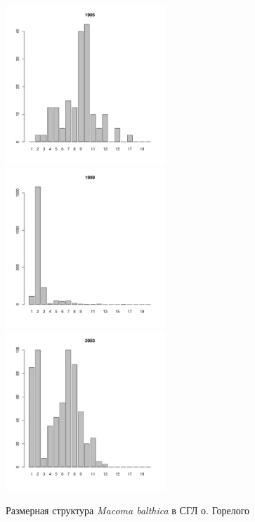 \documentclass[12pt, a4paper]{article}
\begin{document}
\begin{figure}[h]
\begin{multicols}{3}
\hfill
\includegraphics[width=60mm]{../White_Sea/Luvenga_Goreliy/middle_1995_.pdf}
\hfill
\includegraphics[width=60mm]{../White_Sea/Luvenga_Goreliy/middle_1999_.pdf}
\hfill
\includegraphics[width=60mm]{../White_Sea/Luvenga_Goreliy/middle_2003_.pdf}
\end{multicols}


\caption{Размерная структура {\it Macoma balthica} в СГЛ о. Горелого}
\label{ris:size_str_Goreliy_mid}
\end{figure}
\end{document}
